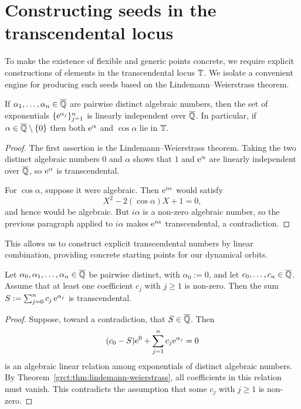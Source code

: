\section{Constructing seeds in the transcendental locus}\label{grct:sec:constructing-seeds}

To make the existence of flexible and generic points concrete, we require explicit constructions of elements in the transcendental locus $\mathbb{T}$. We isolate a convenient engine for producing such seeds based on the Lindemann--Weierstrass theorem.

\begin{theorem}\label{grct:thm:lindemann-weierstrass}
	If $\alpha_1,\dots,\alpha_n\in\overline{\mathbb{Q}}$ are pairwise distinct algebraic numbers, then the set of exponentials $\{\mathrm{e}^{\alpha_j}\}_{j=1}^n$ is linearly independent over $\overline{\mathbb{Q}}$.
	In particular, if $\alpha\in\overline{\mathbb{Q}}\setminus\{0\}$ then both $\mathrm{e}^{\alpha}$ and $\cos\alpha$ lie in $\mathbb{T}$.
\end{theorem}
\begin{proof}
	The first assertion is the Lindemann--Weierstrass theorem. Taking the two distinct algebraic numbers $0$ and $\alpha$ shows that $1$ and $\mathrm{e}^\alpha$ are linearly independent over $\overline{\mathbb{Q}}$, so $\mathrm{e}^\alpha$ is transcendental.
	
	For $\cos\alpha$, suppose it were algebraic. Then $\mathrm{e}^{i\alpha}$ would satisfy
	\[
		X^2-2(\cos\alpha)X+1=0,
	\]
	and hence would be algebraic. But $i\alpha$ is a non-zero algebraic number, so the previous paragraph applied to $i\alpha$ makes $\mathrm{e}^{i\alpha}$ transcendental, a contradiction.
\end{proof}

This allows us to construct explicit transcendental numbers by linear combination, providing concrete starting points for our dynamical orbits.

\begin{theorem}\label{grct:thm:linear-exponential-seed}
	Let $\alpha_0,\alpha_1,\dots,\alpha_n\in\overline{\mathbb{Q}}$ be pairwise distinct, with $\alpha_0:=0$, and let $c_0,\dots,c_n\in\overline{\mathbb{Q}}$. Assume that at least one coefficient $c_j$ with $j\ge1$ is non-zero. Then the sum
	\(
	S:=\sum_{j=0}^n c_j\,\mathrm{e}^{\alpha_j}
	\)
	is transcendental.
\end{theorem}
\begin{proof}
	Suppose, toward a contradiction, that $S\in\overline{\mathbb{Q}}$. Then
	\[
		(c_0-S)\mathrm{e}^0+\sum_{j=1}^n c_j\mathrm{e}^{\alpha_j}=0
	\]
	is an algebraic linear relation among exponentials of distinct algebraic numbers. By Theorem~\ref{grct:thm:lindemann-weierstrass}, all coefficients in this relation must vanish. This contradicts the assumption that some $c_j$ with $j\ge1$ is non-zero.
\end{proof}

